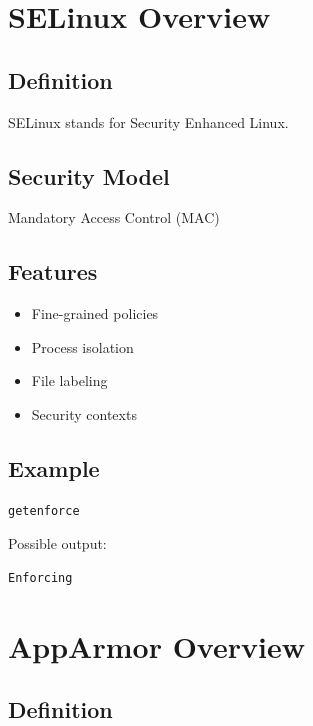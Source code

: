 \section{SELinux Overview}

\subsection{Definition}

SELinux stands for Security Enhanced Linux.

\subsection{Security Model}

Mandatory Access Control (MAC)

\subsection{Features}

\begin{itemize}
\item Fine-grained policies
\item Process isolation
\item File labeling
\item Security contexts
\end{itemize}

\subsection{Example}

\begin{verbatim}
getenforce
\end{verbatim}

Possible output:

\begin{verbatim}
Enforcing
\end{verbatim}

\section{AppArmor Overview}

\subsection{Definition}

